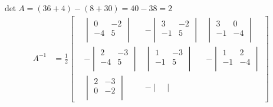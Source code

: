 \documentclass[11pt]{article}
\begin{document}
\(\det A = (36 + 4) - (8 + 30) = 40 - 38 = 2\)
\begin{align*}
  A^{-1} &= \frac{1}{2} \begin{bmatrix}
                          &\begin{vmatrix}
                             0 & -2\\
                             -4 & 5\\
                           \end{vmatrix}
                          &- \begin{vmatrix}
                               3 & -2 \\
                               -1 & 5 \\
                             \end{vmatrix}
                          &\begin{vmatrix}
                             3 & 0 \\
                             -1 & -4\\
                           \end{vmatrix}
                          \\
                          &- \begin{vmatrix}
                               2 & -3 \\
                               -4 & 5 \\
                             \end{vmatrix}
                          &\begin{vmatrix}
                             1 & -3\\
                             -1 & 5 \\
                           \end{vmatrix}
                          &- \begin{vmatrix}
                               1 & 2 \\
                               -1 & -4\\
                             \end{vmatrix}
                          \\
                          &\begin{vmatrix}
                             2 & -3\\
                             0 & -2 \\
                           \end{vmatrix}
                          &- \begin{vmatrix}

\end{vmatrix}
\end{bmatrix}
\end{align*}
\end{document}
